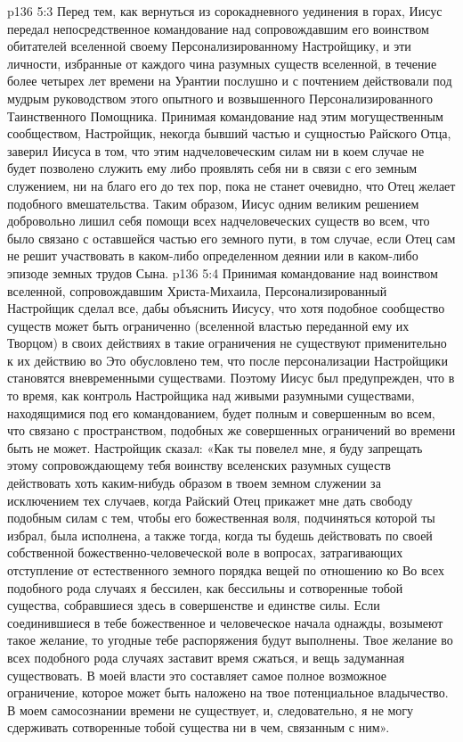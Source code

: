 \vs p136 5:3 \pc Перед тем, как вернуться из сорокадневного уединения в горах, Иисус передал непосредственное командование над сопровождавшим его воинством обитателей вселенной своему Персонализированному Настройщику, и эти личности, избранные от каждого чина разумных существ вселенной, в течение более четырех лет времени на Урантии послушно и с почтением действовали под мудрым руководством этого опытного и возвышенного Персонализированного Таинственного Помощника. Принимая командование над этим могущественным сообществом, Настройщик, некогда бывший частью и сущностью Райского Отца, заверил Иисуса в том, что этим надчеловеческим силам ни в коем случае не будет позволено служить ему либо проявлять себя ни в связи с его земным служением, ни на благо его до тех пор, пока не станет очевидно, что Отец желает подобного вмешательства. Таким образом, Иисус одним великим решением добровольно лишил себя помощи всех надчеловеческих существ во всем, что было связано с оставшейся частью его земного пути, в том случае, если Отец сам не решит участвовать в каком\hyp{}либо определенном деянии или в каком\hyp{}либо эпизоде земных трудов Сына.
\vs p136 5:4 Принимая командование над воинством вселенной, сопровождавшим Христа\hyp{}Михаила, Персонализированный Настройщик сделал все, дабы объяснить Иисусу, что хотя подобное сообщество существ может быть ограниченно (вселенной властью переданной ему их Творцом) в своих действиях в  такие ограничения не существуют применительно к их действию во  Это обусловлено тем, что после персонализации Настройщики становятся вневременными существами. Поэтому Иисус был предупрежден, что в то время, как контроль Настройщика над живыми разумными существами, находящимися под его командованием, будет полным и совершенным во всем, что связано с пространством, подобных же совершенных ограничений во времени быть не может. Настройщик сказал: «Как ты повелел мне, я буду запрещать этому сопровождающему тебя воинству вселенских разумных существ действовать хоть каким\hyp{}нибудь образом в твоем земном служении за исключением тех случаев, когда Райский Отец прикажет мне дать свободу подобным силам с тем, чтобы его божественная воля, подчиняться которой ты избрал, была исполнена, а также тогда, когда ты будешь действовать по своей собственной божественно\hyp{}человеческой воле в вопросах, затрагивающих отступление от естественного земного порядка вещей по отношению ко  Во всех подобного рода случаях я бессилен, как бессильны и сотворенные тобой существа, собравшиеся здесь в совершенстве и единстве силы. Если соединившиеся в тебе божественное и человеческое начала однажды, возымеют такое желание, то угодные тебе распоряжения будут выполнены. Твое желание во всех подобного рода случаях заставит время сжаться, и вещь задуманная  существовать. В моей власти это составляет самое полное возможное ограничение, которое может быть наложено на твое потенциальное владычество. В моем самосознании времени не существует, и, следовательно, я не могу сдерживать сотворенные тобой существа ни в чем, связанным с ним».
